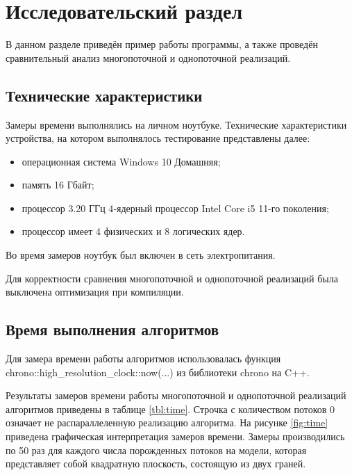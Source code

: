 \chapter{Исследовательский раздел}

В данном разделе приведён пример работы программы, а также проведён сравнительный анализ многопоточной и однопоточной реализаций.

\section{Технические характеристики}

Замеры времени выполнялись на личном ноутбуке. Технические характеристики устройства, на котором выполнялось тестирование представлены далее:

\begin{itemize}[label=---]
	\item операционная система Windows 10 Домашняя;
	\item память 16 Гбайт;
	\item процессор 3.20 ГГц 4‑ядерный процессор Intel Core i5 11-го поколения;
	\item процессор имеет 4 физических и 8 логических ядер.
\end{itemize}

Во время замеров ноутбук был включен в сеть электропитания.

Для корректности сравнения многопоточной и однопоточной реализаций была выключена оптимизация при компиляции.

\section{Время выполнения алгоритмов}

Для замера времени работы алгоритмов использовалась функция \linebreak 
chrono::high\_resolution\_clock::now(...) из библиотеки chrono \cite{chrono} на C++.

Результаты замеров времени работы многопоточной и однопоточной реализаций алгоритмов приведены в таблице \ref{tbl:time}. Строчка с количеством потоков 0 означает не распараллеленную реализацию алгоритма. На рисунке \ref{fig:time} приведена графическая интерпретация замеров времени. Замеры производились по 50 раз для каждого числа порожденных потоков на модели, которая представляет собой квадратную плоскость, состоящую из двух граней.  

